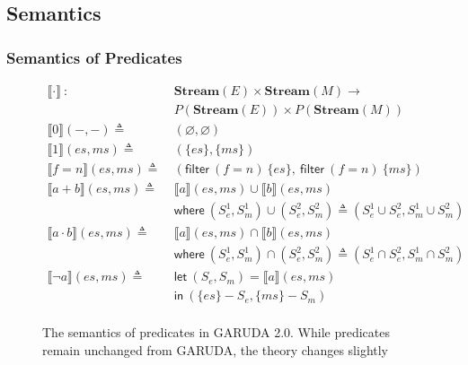 \documentclass[12pt, letterpaper]{article}
\let\emptyset\varnothing
\newcommand\interp[1]{\llbracket #1 \rrbracket}
\def \sysname {\textsc{GARUDA 2.0}\xspace}
\def \oldname {\textsc{GARUDA}\xspace}
\begin{document}
    \clearpage
    \subsection{Semantics}\label{sec:spec:sem}
      \subsubsection{Semantics of Predicates}\label{sec:spec:sem:pred}
    
        \begin{figure}
          \centering
          \begin{align*}
            \interp{ \cdot }\ 
              :\ \ &
              \mathbf{Stream}(E)\times \mathbf{Stream}(M) \rightarrow \\
              & P(\mathbf{Stream}(E))\times P(\mathbf{Stream}(M)) 
              \\
            \interp{ 0 }(-, -)
              \triangleq\ &
              (\emptyset , \emptyset)
              \\ %
            \interp{ 1 }(\mathit{es}, \mathit{ms})
              \triangleq\ &
              (\{\mathit{es}\},\{\mathit{ms}\})
              \\
            \interp{ f=n }(\mathit{es}, \mathit{ms})
              \triangleq\ &
              (\mathsf{filter}\ (f=n)\ \{\mathit{es}\},\
               \mathsf{filter}\ (f=n)\ \{\mathit{ms}\}) 
              \\
            \interp{ a + b }(\mathit{es}, \mathit{ms})
              \triangleq\ &
              \interp { a }(\mathit{es}, \mathit{ms})\cup
              \interp { b }(\mathit{es}, \mathit{ms}) \\
              &\mathsf{where}\ (S_e^1, S_m^1)\cup (S_e^2, S_m^2)\triangleq
                (S_e^1\cup S_e^2, S_m^1\cup S_m^2)\\
            \interp { a \cdot b }(\mathit{es}, \mathit{ms})
              \triangleq\ &
              \interp { a }(\mathit{es}, \mathit{ms})\cap
              \interp { b }(\mathit{es}, \mathit{ms}) \\
              &\mathsf{where}\ (S_e^1, S_m^1)\cap (S_e^2, S_m^2)\triangleq
                (S_e^1\cap S_e^2, S_m^1\cap S_m^2)\\
            \interp { \neg a }(\mathit{es}, \mathit{ms})
              \triangleq\ &
              \mathsf{let}\ (S_e, S_m) = \interp {a}(\mathit{es}, \mathit{ms}) \\
              &\mathsf{in}\ (\{\mathit{es}\} - S_e, \{\mathit{ms}\} - S_m)
              \\
          \end{align*}
          \caption{The semantics of predicates in \sysname.  While predicates remain unchanged from \oldname, the theory changes slightly}
          \label{fig:garuda:sem:pol}
        \end{figure}
\end{document}
